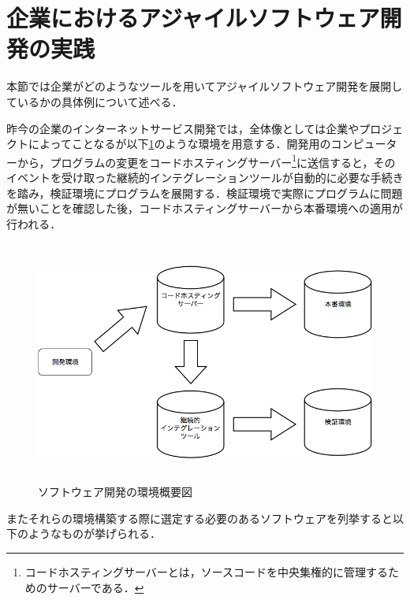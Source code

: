\section{企業におけるアジャイルソフトウェア開発の実践}

本節では企業がどのようなツールを用いてアジャイルソフトウェア開発を展開しているかの具体例について述べる．

昨今の企業のインターネットサービス開発では，全体像としては企業やプロジェクトによってことなるが以下\ref{fig:dev_env}のような環境を用意する．開発用のコンピューターから，プログラムの変更をコードホスティングサーバー\footnote{コードホスティングサーバーとは，ソースコードを中央集権的に管理するためのサーバーである．}に送信すると，そのイベントを受け取った継続的インテグレーションツールが自動的に必要な手続きを踏み，検証環境にプログラムを展開する．検証環境で実際にプログラムに問題が無いことを確認した後，コードホスティングサーバーから本番環境への適用が行われる．

\begin{figure}[H]
\centering
\includegraphics[height=8cm]{./assets/images/dev_env.png}
\caption{ソフトウェア開発の環境概要図}
\label{fig:dev_env}
\end{figure}

またそれらの環境構築する際に選定する必要のあるソフトウェアを列挙すると以下のようなものが挙げられる．

